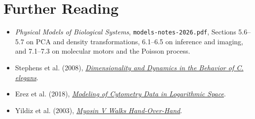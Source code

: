 \section*{Further Reading}

\begin{itemize}
\item \textit{Physical Models of Biological Systems}, \texttt{models-notes-2026.pdf}, Sections 5.6--5.7 on PCA and density transformations, 6.1--6.5 on inference and imaging, and 7.1--7.3 on molecular motors and the Poisson process.
\item Stephens et al. (2008), \href{https://doi.org/10.1371/journal.pcbi.1000028}{\textit{Dimensionality and Dynamics in the Behavior of C. elegans}}.
\item Erez et al. (2018), \href{https://doi.org/10.1002/cyto.a.23333}{\textit{Modeling of Cytometry Data in Logarithmic Space}}.
\item Yildiz et al. (2003), \href{https://doi.org/10.1126/science.1084398}{\textit{Myosin V Walks Hand-Over-Hand}}.
\end{itemize}
